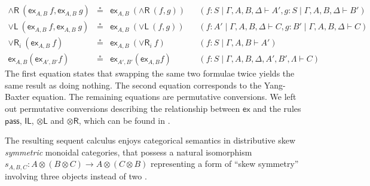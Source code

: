 \documentclass[submission,copyright,creativecommons]{eptcs}
\theoremstyle{definition}
\newcommand{\tl}{\otimes \mathsf{L}}
\newcommand{\tr}{\otimes \mathsf{R}}
\newcommand{\pass}{\mathsf{pass}}
\newcommand{\unitl}{\mathsf{IL}}
\newcommand{\andltwo}{\land \mathsf{L}_{2}}
\newcommand{\andr}{\land \mathsf{R}}
\newcommand{\orl}{\lor \mathsf{L}}
\newcommand{\orrone}{\lor \mathsf{R}_{1}}
\newcommand{\orrtwo}{\lor \mathsf{R}_{2}}
\newcommand{\orri}{\lor \mathsf{R}_{i}}
\newcommand{\ot}{\otimes}
\newcommand{\ex}{\mathsf{ex}}
\begin{document}
\begin{equation*}
\begin{array}{rclll}
  \\
  \andr \ (\ex_{A , B} \ f , \ex_{A , B} \ g) &\circeq &\ex_{A , B} \ (\andr \ (f , g)) &&(f : S \mid \Gamma , A , B , \Delta \vdash A' , g : S \mid \Gamma , A , B , \Delta \vdash B')
  \\
  \orl \ (\ex_{A , B} \ f , \ex_{A , B} \ g) &\circeq &\ex_{A , B} \ (\orl \ (f , g)) &&(f : A' \mid \Gamma , A , B , \Delta \vdash C ,  g : B' \mid \Gamma , A , B , \Delta \vdash C)
  \\
  \orri \ (\ex_{A , B} \ f) &\circeq &\ex_{A , B} \ (\orri \ f) &&(f : S \mid \Gamma , A , B \vdash A')
  \\
  \ex_{A , B}  (\ex_{A' , B'}  f) &\circeq & \ex_{A' , B'}  (\ex_{A , B}  f) &&(f: S \mid \Gamma , A , B , \Delta , A' , B' , \Lambda \vdash C)
\end{array}
\end{equation*}
The first equation states that swapping the same two formulae twice yields the same result as doing nothing.
The second equation corresponds to the Yang-Baxter equation.
The remaining equations are permutative conversions.
We left out permutative conversions describing the relationship between $\ex$ and the rules $\pass$, $\unitl$, $\tl$ and $\tr$, which can be found in \cite[Fig. 2]{veltri:coherence:2021}.

The resulting sequent calculus enjoys categorical semantics in distributive skew \emph{symmetric} monoidal categories, that possess a natural isomorphism $s_{A , B , C} : A \ot (B \ot C) \to A \ot (C \ot B)$ representing a form of ``skew symmetry''  involving three objects instead of two \cite{bourke:lack:braided:2020}.
\end{document}
